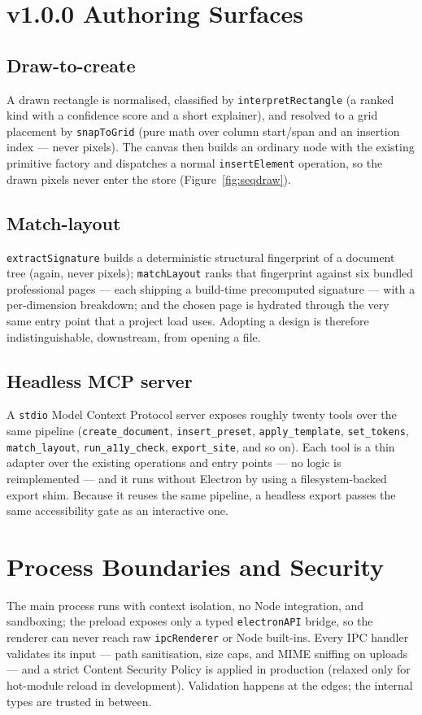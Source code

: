 \section{v1.0.0 Authoring Surfaces}
\subsection{Draw-to-create}
A drawn rectangle is normalised, classified by \texttt{interpretRectangle}
(a ranked kind with a confidence score and a short explainer), and resolved to a
grid placement by \texttt{snapToGrid} (pure math over column start/span and an
insertion index --- never pixels). The canvas then builds an ordinary node with the
existing primitive factory and dispatches a normal \texttt{insertElement} operation,
so the drawn pixels never enter the store (Figure~\ref{fig:seqdraw}).

\subsection{Match-layout}
\texttt{extractSignature} builds a deterministic structural fingerprint of a
document tree (again, never pixels); \texttt{matchLayout} ranks that fingerprint
against six bundled professional pages --- each shipping a build-time precomputed
signature --- with a per-dimension breakdown; and the chosen page is hydrated
through the very same entry point that a project load uses. Adopting a design is
therefore indistinguishable, downstream, from opening a file.

\subsection{Headless MCP server}
A \texttt{stdio} Model Context Protocol server exposes roughly twenty tools over
the same pipeline (\texttt{create\_document}, \texttt{insert\_preset},
\texttt{apply\_template}, \texttt{set\_tokens}, \texttt{match\_layout},
\texttt{run\_a11y\_check}, \texttt{export\_site}, and so on). Each tool is a thin
adapter over the existing operations and entry points --- no logic is
reimplemented --- and it runs without Electron by using a filesystem-backed export
shim. Because it reuses the same pipeline, a headless export passes the same
accessibility gate as an interactive one.

\section{Process Boundaries and Security}
The main process runs with context isolation, no Node integration, and sandboxing;
the preload exposes only a typed \texttt{electronAPI} bridge, so the renderer can
never reach raw \texttt{ipcRenderer} or Node built-ins. Every IPC handler validates
its input --- path sanitisation, size caps, and MIME sniffing on uploads --- and a
strict Content Security Policy is applied in production (relaxed only for
hot-module reload in development). Validation happens at the edges; the internal
types are trusted in between.
